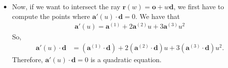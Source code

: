 \documentclass[10pt]{article}
\newcommand{\ve}[1]{\bm{#1}}
\begin{document}
\begin{itemize}
  \item Now, if we want to intersect the ray $\ve{r}(w) = \ve{o} + w \ve{d}$, we first have to compute the points where $\ve{a}'(u) \cdot \ve{d} = 0.$ We have that
  \begin{align*}
    \ve{a}'(u) = \ve{a}^{(1)} + 2 \ve{a}^{(2)} u + 3 \ve{a}^{(3)} u^2
  \end{align*}
  So,
  \begin{align*}
    \ve{a}'(u) \cdot \ve{d} 
    &= (\ve{a}^{(1)} \cdot \ve{d}) + 2 (\ve{a}^{(2)} \cdot \ve{d}) u + 3 (\ve{a}^{(3)} \cdot \ve{d}) u^2.
  \end{align*}
  Therefore, $\ve{a}'(u) \cdot \ve{d} = 0$ is a quadratic equation.  
  
\end{itemize}
		

	
\end{document}
